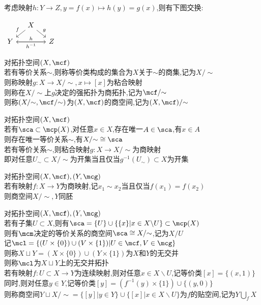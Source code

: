 \begin{zhu}
考虑映射$h:Y\to Z,y=f(x)\mapsto h(y)=g(x)$,则有下图交换:
\begin{center}
    $\begin{tikzcd}[column sep=small,row sep=small]
     & X \ar[dl,"f"'] \ar[dr,"g"] & \\
    Y \ar[rr,"h"] & & Z \ar[ll,"h^{-1}"]
    \end{tikzcd}$
\end{center}
\end{zhu}

\begin{dingyi}
对拓扑空间$(X,\mcf)$\\
若有等价关系$\sim$,则称等价类构成的集合为$X$关于$\sim$的商集,记为$X/{\sim}$\\
则称映射$g:X\to X/{\sim},x\mapsto [x]$为粘合映射\\
则称在$X/{\sim}$上$g$决定的强拓扑为商拓扑,记为$\mcf/{\sim}$\\
则称$(X/{\sim},\mcf/{\sim})$为$(X,\mcf)$的商空间,记为$(X,\mcf)/{\sim}$
\end{dingyi}

\begin{dingli}
对拓扑空间$(X,\mcf)$\\
若有$\sca\subset\mcp(X)$,对任意$x\in X$,存在唯一$A\in\sca$,有$x\in A$\\
则存在唯一等价关系$\sim$,有$X/{\sim} \cong \sca$\\
若有等价关系$\sim$,则粘合映射$g:X\to X/{\sim}$为商映射\\
即对任意$U_{\sim}\subset X/{\sim}$为开集当且仅当$g^{-1}(U_{\sim})\subset X$为开集
\end{dingli}

\begin{dingli}
对拓扑空间$(X,\mcf),(Y,\mcg)$\\
若有映射$f:X\to Y$为商映射,记$x_1\sim x_2$当且仅当$f(x_1)=f(x_2)$\\
则商空间$X/{\sim},Y$同胚
\end{dingli}

\begin{dingyi}
对拓扑空间$(X,\mcf),(Y,\mcg)$\\
若有子集$U\subset X$,则有$\sca=\{U\}\cup\{\{x\}|x\in X\backslash U\}\subset \mcp(X)$\\
则有$\mcm$决定的等价关系的商空间$\sca\cong X/{\sim}$,记为$X/U$\\
记$\mcl=\{(U\times \{0\})\cup(V\times \{1\})|U\in \mcf,V\in \mcg\}$\\
则称$X\sqcup Y=(X\times \{0\})\cup(Y\times \{1\})$为$X$和$Y$的无交并\\
则称$\mcl$为$X\sqcup Y$上的无交并拓扑\\
若有映射$f:U\subset X\to Y$为连续映射,则对任意$x\in X\backslash U$,记等价类$[x]=\{(x,1)\}$\\
同时,则对任意$y\in Y$,记等价类$[y]=(f^{-1}(y)\times \{1\})\cup\{(y,0)\}$\\
则称商空间$Y\sqcup X/{\sim} =\{[y]|y\in Y\}\cup\{[x]|x\in X\backslash U\}$为$f$的贴空间,记为$Y\bigcup\limits_{f}X$
\end{dingyi}

